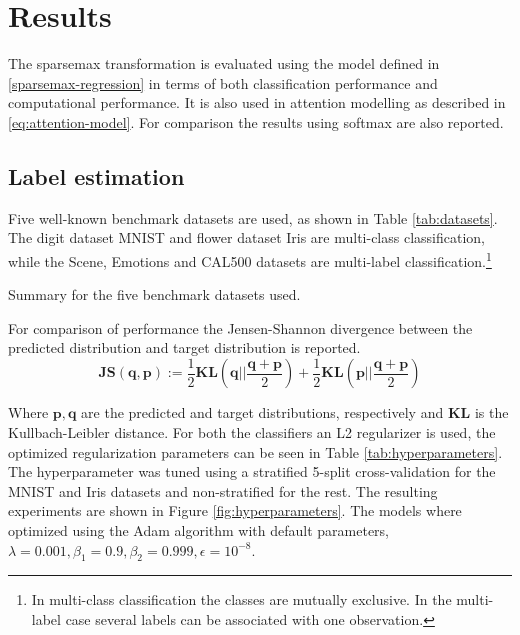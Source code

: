\section{Results}
The sparsemax transformation is evaluated using the model defined in \eqref{sparsemax-regression} in terms of both classification performance and computational performance. It is also used in attention modelling as described in \eqref{eq:attention-model}. For comparison the results using softmax are also reported.

\subsection{Label estimation}
Five well-known benchmark datasets are used, as shown in Table \ref{tab:datasets}. The digit dataset MNIST and flower dataset Iris are multi-class classification, while the Scene, Emotions and CAL500 datasets are multi-label classification.\footnote{In multi-class classification the classes are mutually exclusive. In the multi-label case several labels can be associated with one observation.} 
\begin{table}[H]
\centering

\caption{Summary for the five benchmark datasets used.}
\label{tab:datasets}
\end{table}
For comparison of performance the Jensen-Shannon divergence between the predicted distribution and target distribution is reported.
\begin{equation*}
\mathbf{JS(q,p)}:=\frac{1}{2}\mathbf{KL}\left(\mathbf{q}\Big|\Big|\frac{\mathbf{q}+\mathbf{p}}{2}\right)+\frac{1}{2}\mathbf{KL}\left(\mathbf{p}\Big|\Big|\frac{\mathbf{q}+\mathbf{p}}{2}\right)
\end{equation*}

Where $\mathbf{p}, \mathbf{q}$ are the predicted and target distributions, respectively and $\mathbf{KL}$ is the Kullbach-Leibler distance. For both the classifiers an L2 regularizer is used, the optimized regularization parameters can be seen in Table \ref{tab:hyperparameters}. The hyperparameter was tuned using a stratified 5-split cross-validation for the MNIST and Iris datasets and non-stratified for the rest. The resulting experiments are shown in Figure \ref{fig:hyperparameters}. The models where optimized using the Adam algorithm with default parameters, $\lambda = 0.001, \beta_1=0.9, \beta_2 = 0.999, \epsilon = 10^{-8}$.

